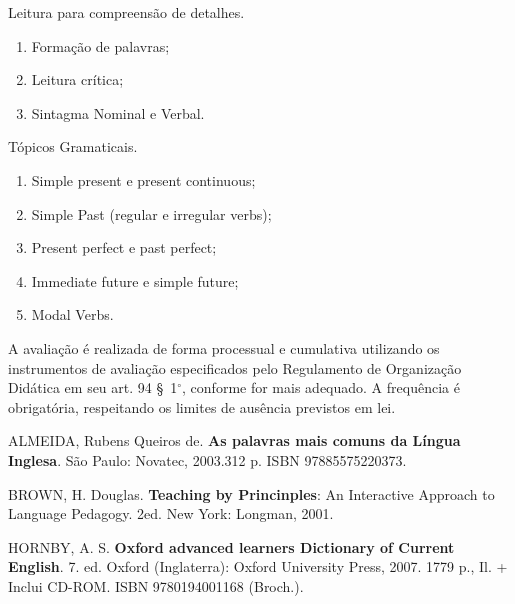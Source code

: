 \begin{pud}
\begin{description}[itemsep=0em]
	   \item[UNIDADE III:] Leitura para compreensão de detalhes.
	    \begin{enumerate}[itemsep=0em, topsep=0em]
	     \item Formação de palavras;
	     \item Leitura crítica;
	     \item Sintagma Nominal e Verbal.
	   \end{enumerate}
	   
	   \item[UNIDADE IV:] Tópicos Gramaticais.
	    \begin{enumerate}[itemsep=0em, topsep=0em]
	     \item Simple present e present continuous;
	     \item Simple Past (regular e irregular verbs);
	     \item Present perfect e past perfect;
	     \item Immediate future e simple future;
	     \item Modal Verbs.
	   \end{enumerate}
	\end{description}
	
	\avaliacao
	A avaliação é realizada de forma processual e cumulativa utilizando os instrumentos de avaliação especificados pelo Regulamento de Organização Didática em seu art. 94 \S~1$^\circ$, conforme for mais adequado. A frequência é obrigatória, respeitando os limites de ausência previstos em lei.
	\naopresencial
	
	
	\begin{bibbasica}
		\item ALMEIDA, Rubens Queiros de. \textbf{As palavras mais comuns da Língua Inglesa}. São Paulo: Novatec, 2003.312 p. ISBN 97885575220373.
		\item BROWN, H. Douglas. \textbf{Teaching by Princinples}: An Interactive Approach to Language Pedagogy. 2ed. New York: Longman, 2001.
		\item HORNBY, A. S. \textbf{Oxford advanced learners Dictionary of Current English}. 7. ed. Oxford (Inglaterra): Oxford University Press, 2007. 1779 p., Il. + Inclui CD-ROM. ISBN 9780194001168 (Broch.).
	\end{bibbasica}
	

\end{pud}

